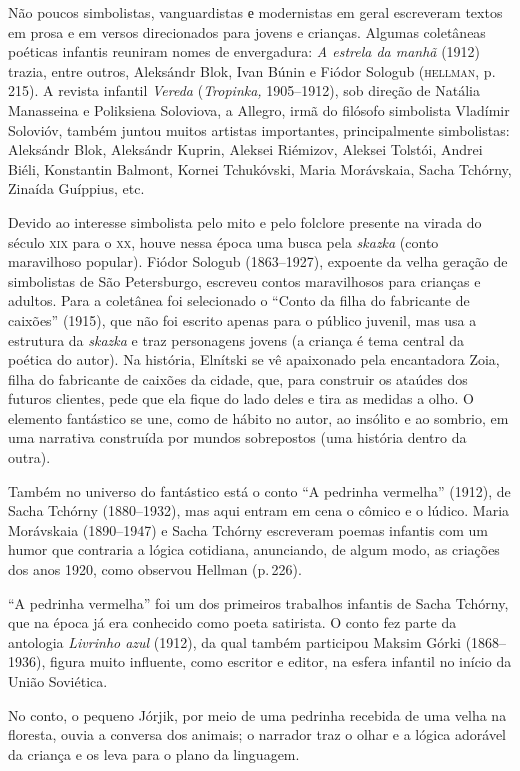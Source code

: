 Não poucos simbolistas, vanguardistas е modernistas em geral escreveram
textos em prosa e em versos direcionados para jovens e crianças. Algumas
coletâneas poéticas infantis reuniram nomes de envergadura: \emph{A
estrela da manhã} (1912) trazia, entre outros,
Aleksándr Blok, Ivan Búnin e Fiódor Sologub (\textsc{hellman}, p.\,215). A revista
infantil \emph{Vereda} (\emph{Tropinka,} 1905--1912), sob direção de
Natália Manasseina e Poliksiena Soloviova, a Allegro, irmã do filósofo simbolista Vladímir Solovióv,
também juntou muitos artistas importantes, principalmente simbolistas:
Aleksándr Blok, Aleksándr Kuprin, Aleksei Riémizov, Aleksei Tolstói,
Andrei Biéli, Konstantin Balmont, Kornei Tchukóvski, Maria Morávskaia,
Sacha Tchórny, Zinaída Guíppius, etc.

Devido ao interesse simbolista pelo mito e pelo folclore presente na
virada do século \textsc{xix} para o \textsc{xx}, houve nessa época uma busca pela
\emph{skazka} (conto maravilhoso popular). Fiódor Sologub (1863--1927),
expoente da velha geração de simbolistas de São Petersburgo, escreveu
contos maravilhosos para crianças e adultos. Para a coletânea foi
selecionado o ``Conto da filha do fabricante de caixões'' (1915),
que não foi escrito apenas para o público juvenil, mas usa a estrutura
da \emph{skazka} e traz personagens jovens (a criança é tema central da
poética do autor). Na história, Elnítski se vê apaixonado pela
encantadora Zoia, filha do fabricante de caixões da cidade, que, para
construir os ataúdes dos futuros clientes, pede que ela fique do lado
deles e tira as medidas a olho. O elemento fantástico se une, como de
hábito no autor, ao insólito e ao sombrio, em uma narrativa construída
por mundos sobrepostos (uma história dentro da outra).

Também no universo do fantástico está o conto ``A pedrinha vermelha''
(1912), de Sacha Tchórny (1880--1932), mas aqui entram em cena o
cômico e o lúdico. Maria Morávskaia (1890--1947) e Sacha Tchórny
escreveram poemas infantis com um humor que contraria a lógica
cotidiana, anunciando, de algum modo, as criações dos anos 1920, como
observou Hellman (p.\,226).

``A pedrinha vermelha'' foi um dos primeiros trabalhos infantis de Sacha
Tchórny, que na época já era conhecido como poeta satirista. O conto fez
parte da antologia \emph{Livrinho azul} (1912), da qual também participou Maksim Górki (1868--1936), figura muito influente, como escritor e
editor, na esfera infantil no início da União Soviética.

No conto, o pequeno Jórjik, por meio de uma pedrinha recebida
de uma velha na floresta, ouvia a conversa dos animais; o narrador traz
o olhar e a lógica adorável da criança e os leva para o plano da
linguagem.

